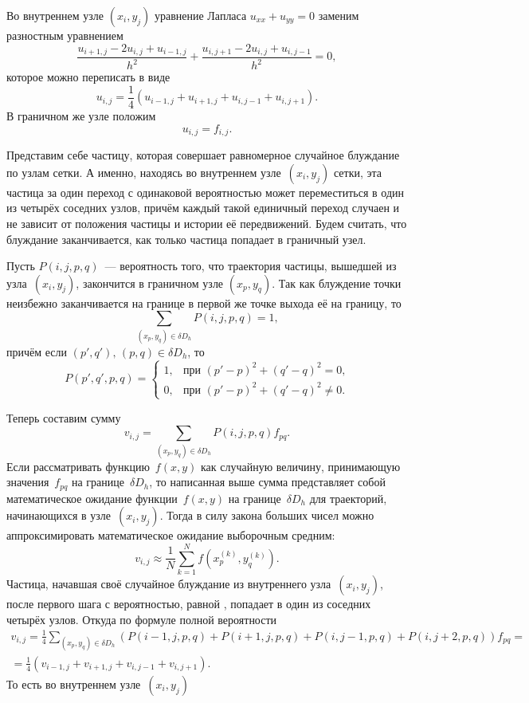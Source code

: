 Во внутреннем узле $(x_i,y_j)$ уравнение Лапласа $u_{xx}+u_{yy} = 0$ заменим разностным уравнением
$$
\dfrac{u_{i+1,j}-2u_{i,j}+u_{i-1,j}}{h^2} + \dfrac{u_{i,j+1}-2u_{i,j}+u_{i,j-1}}{h^2} = 0,
$$
которое можно переписать в виде
$$
u_{i,j}=\dfrac{1}{4}(u_{i-1,j}+u_{i+1,j}+u_{i,j-1}+u_{i,j+1}).
$$
В граничном же узле положим
$$
u_{i,j}=f_{i,j}.
$$

Представим себе частицу, которая совершает равномерное случайное блуждание по узлам сетки. А именно, находясь во внутреннем узле~$(x_i,y_j)$  сетки, эта частица за один переход с одинаковой вероятностью  может переместиться в один из четырёх соседних узлов, причём каждый такой единичный переход случаен и не зависит от положения частицы и истории её передвижений. Будем считать, что блуждание заканчивается, как только частица попадает в граничный узел.

Пусть $P(i,j,p,q)$~--- вероятность того, что траектория частицы, вышедшей из узла~$(x_i,y_j)$, закончится в граничном узле $(x_p,y_q)$. Так как блуждение точки неизбежно заканчивается на границе в первой же точке выхода её на границу, то
$$
        \sum\limits_{(x_p,y_q)\in\delta D_h}P(i,j,p,q)=1,
$$
причём если $(p',q'),\,(p,q) \in \delta D_h$, то
$$
        P(p',q',p,q)
=
        \begin{cases}
1,
        &
\mbox{при $(p'-p)^2+(q'-q)^2=0$,}
        \\
0,
        &
\mbox{при $(p'-p)^2+(q'-q)^2\ne0$.}
        \end{cases}
$$

Теперь составим сумму
$$
        v_{i,j}
=
        \sum\limits_{(x_p,y_q)\in\delta D_h}P(i,j,p,q)f_{pq}.
$$
Если рассматривать функцию~$f(x,y)$ как случайную величину, принимающую значения~$f_{pq}$ на границе~$\delta D_h$, то написанная выше сумма представляет собой математическое ожидание функции~$f(x,y)$ на границе~$\delta D_h$ для траекторий, начинающихся в узле~$(x_i,y_j)$. Тогда в силу закона больших чисел можно аппроксимировать математическое ожидание выборочным средним:
$$
        v_{i,j}
\approx
        \frac{1}{N}\sum\limits_{k=1}^{N}f\left(x_p^{(k)},y_q^{(k)}\right).
$$
Частица, начавшая своё случайное блуждание из внутреннего узла~$(x_i,y_j)$, после первого шага с вероятностью, равной , попадает в один из соседних четырёх узлов. Откуда по формуле полной вероятности
\begin{multline*}
        v_{i,j}
=
        \frac{1}{4}\sum\limits_{(x_p,y_q)\in\delta D_h}(P(i-1,j,p,q)+P(i+1,j,p,q)+P(i,j-1,p,q)+P(i,j+2,p,q))f_{pq}
=\\=
        \frac{1}{4}(v_{i-1,j}+v_{i+1,j}+v_{i,j-1}+v_{i,j+1}).
\end{multline*}
То есть во внутреннем узле~$(x_i,y_j)$

